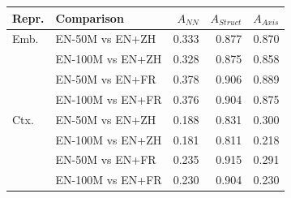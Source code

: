 \begin{tabular}{@{}llrrr@{}}
\toprule
Repr. & Comparison & $A_{NN}$ & $A_{Struct}$ & $A_{Axis}$ \\
\midrule
Emb. & EN-50M vs EN+ZH & 0.333 & 0.877 & 0.870 \\
 & EN-100M vs EN+ZH & 0.328 & 0.875 & 0.858 \\
 & EN-50M vs EN+FR & 0.378 & 0.906 & 0.889 \\
 & EN-100M vs EN+FR & 0.376 & 0.904 & 0.875 \\
Ctx. & EN-50M vs EN+ZH & 0.188 & 0.831 & 0.300 \\
 & EN-100M vs EN+ZH & 0.181 & 0.811 & 0.218 \\
 & EN-50M vs EN+FR & 0.235 & 0.915 & 0.291 \\
 & EN-100M vs EN+FR & 0.230 & 0.904 & 0.230 \\
\bottomrule
\end{tabular}
